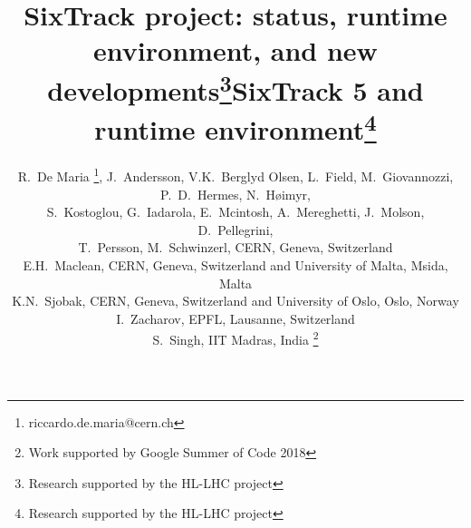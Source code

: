 \documentclass{ws-ijmpa}
\begin{document}
\title{SixTrack project: status, runtime environment, and new developments\footnote{Research supported by the HL-LHC project}}

\title{SixTrack 5 and runtime environment\thanks{Research supported by the HL-LHC project}}

\author{
R.~De Maria \footnote{riccardo.de.maria@cern.ch},
J.~Andersson,
V.K.~Berglyd Olsen,
L.~Field,
M.~Giovannozzi,
P.~D.~Hermes,
N.~H\o imyr, \\
S.~Kostoglou,
G.~Iadarola,
E.~Mcintosh,
A.~Mereghetti,
J.~Molson,
D.~Pellegrini,\\
T.~Persson,
M.~Schwinzerl,
CERN, Geneva, Switzerland \\
E.H.~Maclean, CERN, Geneva, Switzerland and University of Malta, Msida, Malta\\
K.N.~Sjobak, CERN, Geneva, Switzerland and University of Oslo, Oslo, Norway\\
I.~Zacharov, EPFL, Lausanne, Switzerland \\
S.~Singh, IIT Madras, India \thanks{Work supported by Google Summer of Code 2018}
}
\maketitle

\end{document}
